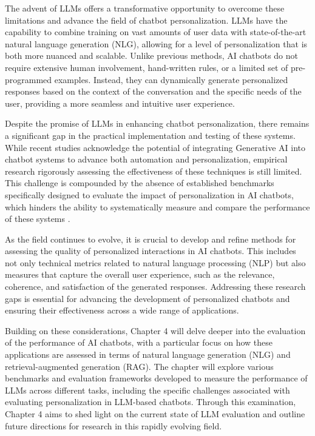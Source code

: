 The advent of LLMs offers a transformative opportunity to overcome these limitations and advance the field of chatbot personalization. LLMs have the capability to combine training on vast amounts of user data with state-of-the-art natural language generation (NLG), allowing for a level of personalization that is both more nuanced and scalable. Unlike previous methods, AI chatbots do not require extensive human involvement, hand-written rules, or a limited set of pre-programmed examples. Instead, they can dynamically generate personalized responses based on the context of the conversation and the specific needs of the user, providing a more seamless and intuitive user experience.

Despite the promise of LLMs in enhancing chatbot personalization, there remains a significant gap in the practical implementation and testing of these systems. While recent studies acknowledge the potential of integrating Generative AI into chatbot systems to advance both automation and personalization, empirical research rigorously assessing the effectiveness of these techniques is still limited. This challenge is compounded by the absence of established benchmarks specifically designed to evaluate the impact of personalization in AI chatbots, which hinders the ability to systematically measure and compare the performance of these systems \cite{verma2023generative}.

As the field continues to evolve, it is crucial to develop and refine methods for assessing the quality of personalized interactions in AI chatbots. This includes not only technical metrics related to natural language processing (NLP) but also measures that capture the overall user experience, such as the relevance, coherence, and satisfaction of the generated responses. Addressing these research gaps is essential for advancing the development of personalized chatbots and ensuring their effectiveness across a wide range of applications.

Building on these considerations, Chapter 4 will delve deeper into the evaluation of the performance of AI chatbots, with a particular focus on how these applications are assessed in terms of natural language generation (NLG) and retrieval-augmented generation (RAG). The chapter will explore various benchmarks and evaluation frameworks developed to measure the performance of LLMs across different tasks, including the specific challenges associated with evaluating personalization in LLM-based chatbots. Through this examination, Chapter 4 aims to shed light on the current state of LLM evaluation and outline future directions for research in this rapidly evolving field.
